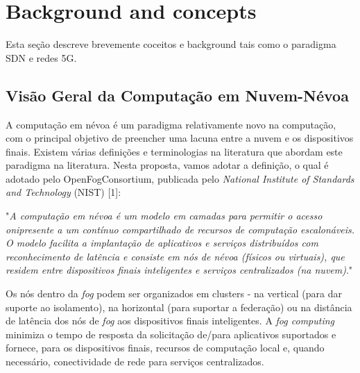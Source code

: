 \clearpage
\section{Background and concepts}
\label{ch:background}

Esta seção descreve brevemente coceitos e background tais como o paradigma SDN e redes 5G.

\subsection{Visão Geral da Computação em Nuvem-Névoa}

A computação em névoa é um paradigma relativamente novo na computação, com o principal objetivo de preencher uma lacuna entre a nuvem e os dispositivos finais. Existem várias definições e terminologias na literatura que abordam este paradigma na literatura. Nesta proposta, vamos adotar a definição, o qual é adotado pelo OpenFogConsortium, publicada pelo \textit{National Institute of Standards and Technology} (NIST) [1]: 

\begin{displayquote}

 "\textit{A computação em névoa é um modelo em camadas para permitir o acesso onipresente a um contínuo compartilhado de recursos de computação escalonáveis. O modelo facilita a implantação de aplicativos e serviços distribuídos com reconhecimento de latência e consiste em nós de névoa (físicos ou virtuais), que residem entre dispositivos finais inteligentes e serviços centralizados (na nuvem)}."

\end{displayquote}

Os nós dentro da \textit{fog} podem ser organizados em clusters - na vertical (para dar suporte ao isolamento), na horizontal (para suportar a federação) ou na distância de latência dos nós de \textit{fog} aos dispositivos finais inteligentes. A \textit{fog computing} minimiza o tempo de resposta da solicitação de/para aplicativos suportados e fornece, para os dispositivos finais, recursos de computação local e, quando necessário, conectividade de rede para serviços centralizados.

